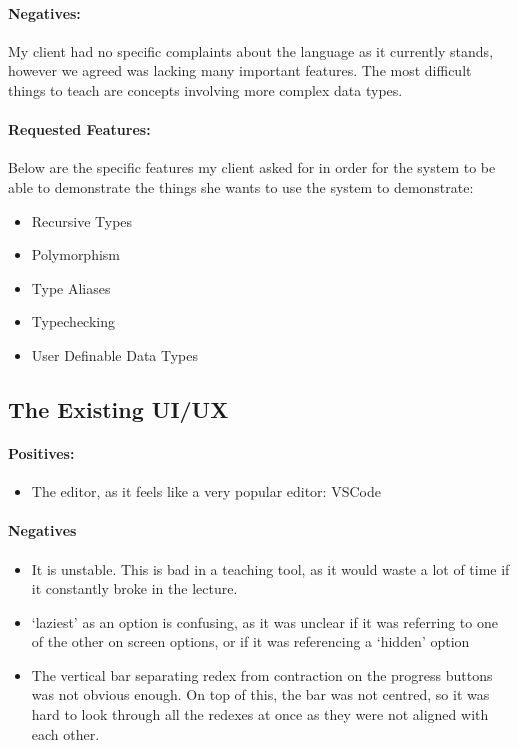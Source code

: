 \paragraph{Negatives:}
My client had no specific complaints about the language as it currently stands, however we agreed was lacking many important features. The most difficult things to teach are concepts involving more complex data types. 

\paragraph{Requested Features:}
Below are the specific features my client asked for in order for the system to be able to demonstrate the things she wants to use the system to demonstrate:
\begin{itemize}
    \item Recursive Types
    \item Polymorphism
    \item Type Aliases
    \item Typechecking
    \item User Definable Data Types
\end{itemize}

\subsection{The Existing UI/UX}
\paragraph{Positives:}
\begin{itemize}
    \item The editor, as it feels like a very popular editor: VSCode
\end{itemize}

\paragraph{Negatives}
\begin{itemize}
    \item It is unstable. This is bad in a teaching tool, as it would waste a lot of time if it constantly broke in the lecture. 
    \item `laziest' as an option is confusing, as it was unclear if it was referring to one of the other on screen options, or if it was referencing a `hidden' option
    \item The vertical bar separating redex from contraction on the progress buttons was not obvious enough. On top of this, the bar was not centred, so it was hard to look through all the redexes at once as they were not aligned with each other. 
\end{itemize}

